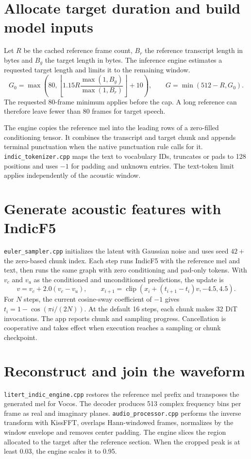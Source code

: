 \section{Allocate target duration and build model inputs}

Let $R$ be the cached reference frame count, $B_r$ the reference transcript
length in bytes and $B_g$ the target length in bytes. The inference engine
estimates a requested target length and limits it to the remaining window.
\[
G_0=\max\left(80,\left\lfloor
1.15 R\frac{\max(1,B_g)}{\max(1,B_r)}
\right\rfloor+10\right),\qquad G=\min(512-R,G_0).
\]
The requested 80-frame minimum applies before the cap. A long reference can
therefore leave fewer than 80 frames for target speech.

The engine copies the reference mel into the leading rows of a zero-filled
conditioning tensor. It combines the transcript and target chunk and
appends terminal punctuation when the native punctuation rule calls for
it. \texttt{indic\_tokenizer.cpp} maps the text to vocabulary IDs, truncates
or pads to 128 positions and uses $-1$ for padding and unknown entries.
The text-token limit applies independently of the acoustic window.

\section{Generate acoustic features with IndicF5}

\texttt{euler\_sampler.cpp} initializes the latent with Gaussian noise
and uses seed $42+$ the zero-based chunk index. Each step runs IndicF5 with
the reference mel and text, then runs the same graph with zero conditioning
and pad-only tokens. With $v_c$ and $v_u$ as the conditioned and
unconditioned predictions, the update is
\[
v=v_c+2.0(v_c-v_u),\qquad
x_{i+1}=\operatorname{clip}(x_i+(t_{i+1}-t_i)v,-4.5,4.5).
\]
For $N$ steps, the current cosine-sway coefficient of $-1$ gives
$t_i=1-\cos(\pi i/(2N))$. At the default 16 steps, each chunk makes 32
DiT invocations. The app reports chunk and sampling progress.
Cancellation is cooperative and takes effect when execution reaches a
sampling or chunk checkpoint.

\section{Reconstruct and join the waveform}

\texttt{litert\_indic\_engine.cpp} restores the reference mel prefix and
transposes the generated mel for Vocos. The decoder produces 513 complex
frequency bins per frame as real and imaginary planes.
\texttt{audio\_processor.cpp} performs the inverse transform with KissFFT,
overlaps Hann-windowed frames, normalizes by the window envelope and
removes center padding. The engine slices the region allocated to the
target after the reference section. When the cropped peak is at least
0.03, the engine scales it to 0.95.

